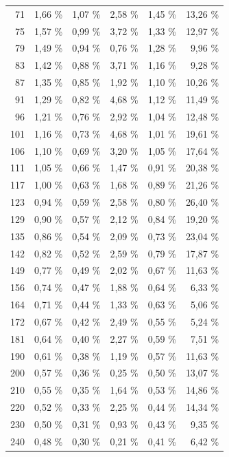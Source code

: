 \documentclass[11pt,twoside,a4paper]{report}
\begin{document}
{\begin{longtable}{rrrrrr}
    71    & 1,66 \% & 1,07 \% & 2,58 \% & 1,45 \% & 13,26 \% \\
    75    & 1,57 \% & 0,99 \% & 3,72 \% & 1,33 \% & 12,97 \% \\
    79    & 1,49 \% & 0,94 \% & 0,76 \% & 1,28 \% & 9,96 \% \\
    83    & 1,42 \% & 0,88 \% & 3,71 \% & 1,16 \% & 9,28 \% \\
    87    & 1,35 \% & 0,85 \% & 1,92 \% & 1,10 \% & 10,26 \% \\
    91    & 1,29 \% & 0,82 \% & 4,68 \% & 1,12 \% & 11,49 \% \\
    96    & 1,21 \% & 0,76 \% & 2,92 \% & 1,04 \% & 12,48 \% \\
    101   & 1,16 \% & 0,73 \% & 4,68 \% & 1,01 \% & 19,61 \% \\
    106   & 1,10 \% & 0,69 \% & 3,20 \% & 1,05 \% & 17,64 \% \\
    111   & 1,05 \% & 0,66 \% & 1,47 \% & 0,91 \% & 20,38 \% \\
    117   & 1,00 \% & 0,63 \% & 1,68 \% & 0,89 \% & 21,26 \% \\
    123   & 0,94 \% & 0,59 \% & 2,58 \% & 0,80 \% & 26,40 \% \\
    129   & 0,90 \% & 0,57 \% & 2,12 \% & 0,84 \% & 19,20 \% \\
    135   & 0,86 \% & 0,54 \% & 2,09 \% & 0,73 \% & 23,04 \% \\
    142   & 0,82 \% & 0,52 \% & 2,59 \% & 0,79 \% & 17,87 \% \\
    149   & 0,77 \% & 0,49 \% & 2,02 \% & 0,67 \% & 11,63 \% \\
    156   & 0,74 \% & 0,47 \% & 1,88 \% & 0,64 \% & 6,33 \% \\
    164   & 0,71 \% & 0,44 \% & 1,33 \% & 0,63 \% & 5,06 \% \\
    172   & 0,67 \% & 0,42 \% & 2,49 \% & 0,55 \% & 5,24 \% \\
    181   & 0,64 \% & 0,40 \% & 2,27 \% & 0,59 \% & 7,51 \% \\
    190   & 0,61 \% & 0,38 \% & 1,19 \% & 0,57 \% & 11,63 \% \\
    200   & 0,57 \% & 0,36 \% & 0,25 \% & 0,50 \% & 13,07 \% \\
    210   & 0,55 \% & 0,35 \% & 1,64 \% & 0,53 \% & 14,86 \% \\
    220   & 0,52 \% & 0,33 \% & 2,25 \% & 0,44 \% & 14,34 \% \\
    230   & 0,50 \% & 0,31 \% & 0,93 \% & 0,43 \% & 9,35 \% \\
    240   & 0,48 \% & 0,30 \% & 0,21 \% & 0,41 \% & 6,42 \% \\

\end{longtable}}
\end{document}
